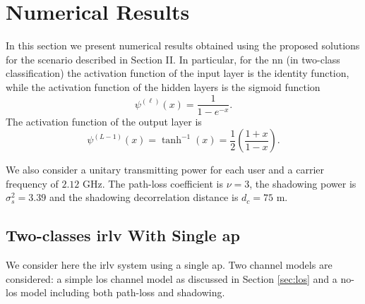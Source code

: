 \documentclass[draftcls,onecolumn,12pt]{IEEEtran}
\begin{document}

 

    


\section{Numerical Results}

In this section we present numerical results obtained using the proposed solutions for the scenario described in Section II. In particular, for the \ac{nn} (in two-class classification) the activation function of the input layer is the identity function, while the activation function of the hidden layers is the sigmoid function
\begin{equation}
\psi^{(\ell)}(x) = \frac{1}{1-e^{-x}}.
\end{equation}
The activation function of the output layer is 
\begin{equation}
\psi^{(L-1)}(x)=\tanh^{-1}(x) = \frac{1}{2} \left( \frac{1+x}{1-x} \right).
\end{equation}

We also consider  a unitary transmitting power for each user and a carrier frequency of $2.12$ GHz. The path-loss coefficient is $\nu=3$, the shadowing power is $\sigma_s^2=3.39$ and the shadowing decorrelation distance is $d_c=75$ m. 


\subsection{Two-classes \ac{irlv} With Single \ac{ap}}

We consider here the \ac{irlv} system using a single \ac{ap}. Two channel models are considered: a simple \ac{los} channel model as discussed in Section \ref{sec:los} and a no-\ac{los} model including both path-loss and shadowing.
\end{document}
